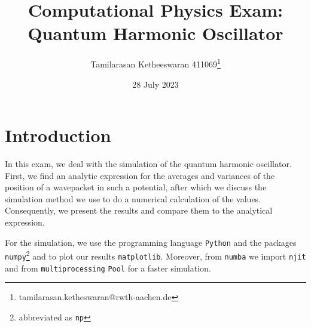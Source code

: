 \documentclass[11pt, A4paper]{article}
\title{Computational Physics Exam: \\ Quantum Harmonic Oscillator}
\author{Tamilarasan Ketheeswaran 411069\footnote{tamilarasan.ketheswaran@rwth-aachen.de}}
\date{28 July 2023}
\makeatletter
\newcommand{\T}[1]{\texttt{#1}}
\let\oldappendix\appendix %
\renewcommand\appendix{%
    \oldappendix
    \newcommand{\section@cntformat}{\appendixname~\thesection\quad}
}
\makeatother
\begin{document}
\maketitle
\tableofcontents

\section{Introduction}
In this exam, we deal with the simulation of the quantum harmonic oscillator. First, we find an analytic expression for the averages and variances of the position of a wavepacket in such a potential, after which we discuss the simulation method we use to do a numerical calculation of the values. Consequently, we present the results and compare them to the analytical expression. 

For the simulation, we use the programming language \T{Python} and the packages \T{numpy}\footnote{abbreviated as \T{np}} and to plot our results \T{matplotlib}. Moreover, from \T{numba} we import \T{njit} and from \T{multiprocessing} \T{Pool} for a faster simulation. \\



\clearpage

\clearpage
\appendix

\end{document}
